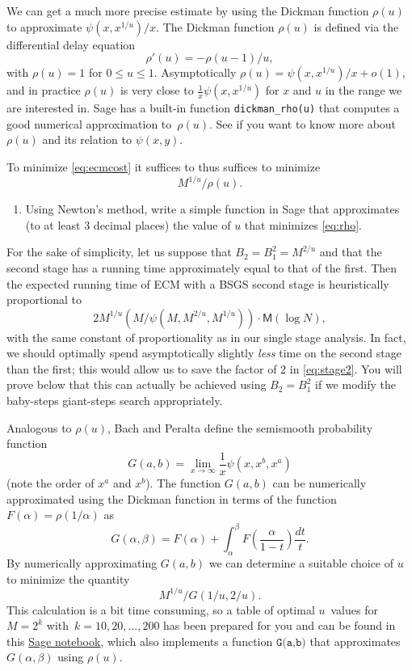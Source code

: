 \documentclass[11pt]{article}
\newcommand{\M}{\textsf{M}}
\theoremstyle{definition}
\begin{document}
We can get a much more precise estimate by using the Dickman function $\rho(u)$ to approximate $\psi(x,x^{1/u})/x$.
The Dickman function $\rho(u)$ is defined via the differential delay equation
\[
\rho'(u)=-\rho(u-1)/u,
\]
with $\rho(u)=1$ for $0\le u\le 1$.
Asymptotically $\rho(u)=\psi(x,x^{1/u})/x + o(1)$, and in practice $\rho(u)$ is very close to $\frac{1}{x}\psi(x,x^{1/u})$ for $x$ and $u$ in the range we are interested in.
Sage has a built-in function \texttt{dickman\_rho(u)} that computes  a good numerical approximation to~$\rho(u)$.
See \cite[\S 1]{G} if you want to know more about $\rho(u)$ and its relation to $\psi(x,y)$.

To minimize \eqref{eq:ecmcost} it suffices to thus suffices to minimize
\begin{equation}\label{eq:rho}
M^{1/u}/\rho(u).
\end{equation}

\begin{enumerate}[{\bf(a)}]
\item Using Newton's method, write a simple function in Sage that approximates (to at least 3 decimal places) the value of $u$ that minimizes \eqref{eq:rho}.
\end{enumerate}

For the sake of simplicity, let us suppose that $B_2 = B_1^2 = M^{2/u}$ and that the second stage has a running time approximately equal to that of the first.
Then the expected running time of ECM with a BSGS second stage is heuristically proportional to
\begin{equation}\label{eq:stage2}
2M^{1/u}(M/\psi(M,M^{2/u},M^{1/u}))\cdot\M(\log N),
\end{equation}
with the same constant of proportionality as in our single stage analysis.  In fact, we should optimally spend asymptotically slightly \emph{less} time on the second stage than the first; this would allow us to save the factor of 2 in \eqref{eq:stage2}.
You will prove below that this can actually be achieved using $B_2=B_1^2$ if we modify the baby-steps giant-steps search appropriately.

Analogous to $\rho(u)$, Bach and Peralta \cite{BP} define the semismooth probability function
\[
G(a,b)=\lim_{x\to\infty}\frac{1}{x}\psi(x,x^b,x^a)
\] (note the order of $x^a$ and $x^b$).  The function $G(a,b)$ can be numerically approximated using the Dickman function in terms of the function $F(\alpha)=\rho(1/\alpha)$ as
\[
G(\alpha,\beta)=F(\alpha)+\int_\alpha^\beta F\left(\frac{\alpha}{1-t}\right)\frac{dt}{t}.
\]
By numerically approximating $G(a,b)$ we can determine a suitable choice of $u$ to minimize the quantity
\begin{equation}\label{eq:G}
M^{1/u}/G(1/u,2/u).
\end{equation}
This calculation is a bit time consuming, so a table of optimal $u$~values for $M=2^k$ with~$k=10,20,\ldots,200$ has been prepared for you and can be found in this \href{https://cocalc.com/share/public_paths/6687e3b7c0d74f9d05ad70cca2fa6c434e7585a2}{Sage notebook}, which also implements a function $\texttt{G(a,b)}$ that approximates $G(\alpha,\beta)$ using $\rho(u)$.
\end{document}
